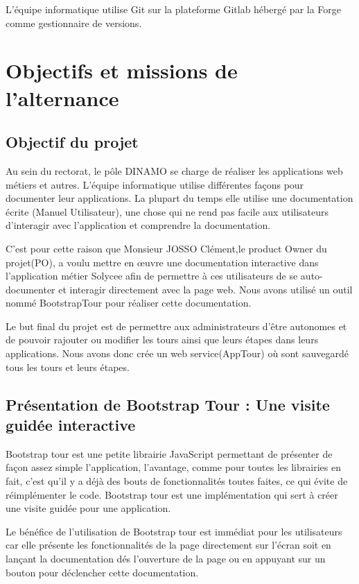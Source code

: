 \documentclass[12pt]{article}
\begin{document}
L'équipe informatique utilise Git sur la plateforme Gitlab hébergé par la Forge comme gestionnaire de versions. 


\section{Objectifs et missions de l'alternance}

\subsection{Objectif du projet}

Au sein du rectorat, le pôle DINAMO se charge de réaliser les applications web métiers et autres. L'équipe informatique utilise différentes façons pour documenter leur applications. La plupart du temps elle utilise une documentation écrite (Manuel Utilisateur), une chose qui ne rend pas facile aux utilisateurs d’interagir avec l'application et comprendre la documentation. 


C'est pour cette raison que Monsieur JOSSO Clément,le product Owner du projet(PO), a voulu mettre en œuvre une documentation interactive dans l'application métier Solycee afin de permettre à ces  utilisateurs de se auto-documenter et interagir directement avec la page web. Nous avons utilisé un outil nommé BootstrapTour pour réaliser cette documentation. 

Le but final du projet est de permettre aux administrateurs d'être autonomes et de pouvoir rajouter ou modifier les tours ainsi que leurs  étapes dans leurs applications. Nous avons donc crée un web service(AppTour) où sont sauvegardé tous les tours et leurs étapes.

\subsection{Présentation de Bootstrap Tour : Une visite guidée interactive}
 
Bootstrap tour est une petite librairie JavaScript permettant de présenter de façon assez simple l’application, l’avantage, comme pour toutes les librairies en fait, c’est qu’il y a déjà des bouts de fonctionnalités toutes faites, ce qui évite de réimplémenter le code. Bootstrap tour est une implémentation qui sert à créer une visite guidée pour une application.

Le bénéfice de l'utilisation de Bootstrap tour est immédiat pour les utilisateurs car elle présente les fonctionnalités de la page directement sur l'écran soit en lançant la documentation  dés l'ouverture de la page ou en appuyant sur un bouton pour déclencher cette documentation.
\end{document}
